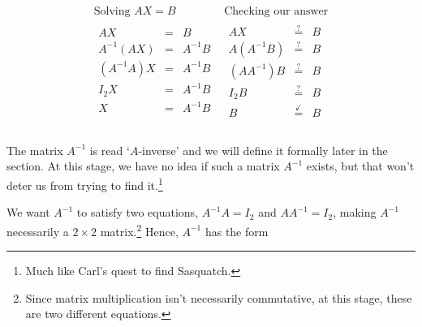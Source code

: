 \documentclass{ximera}
\begin{document}
\[ \begin{array}{cc}  

\text{Solving $AX = B$} & \text{Checking our answer} \\

\begin{array}{rcl}

AX & = & B \\

A^{-1}(AX) & = & A^{-1}B \\

\left(A^{-1}A\right) X & = & A^{-1}B \\

I_2X & = & A^{-1}B \\

X & = & A^{-1}B \\

\end{array} 

&

\begin{array}{rcl}

AX & \stackrel{?}{=} & B \\

A \left(A^{-1}B\right) & \stackrel{?}{=} & B \\

\left(AA^{-1}\right) B & \stackrel{?}{=}& B \\

I_2B & \stackrel{?}{=} & B \\

B & \stackrel{\checkmark}{=}& B \\

\end{array} \\

\end{array}\]

 \label{solvingmatrixeqn}

The matrix $A^{-1}$ is read `$A$-inverse' and we will define it formally later in the section. At this stage, we have no idea if such a matrix $A^{-1}$ exists, but that won't deter us from trying to find it.\footnote{Much like Carl's quest to find Sasquatch.} 

We want $A^{-1}$ to satisfy two equations, $A^{-1}A = I_2$ and $AA^{-1} = I_2$, making $A^{-1}$ necessarily a $2 \times 2$ matrix.\footnote{Since matrix multiplication isn't necessarily commutative, at this stage, these are two different equations.}  Hence,  $A^{-1}$ has the form 
\end{document}
